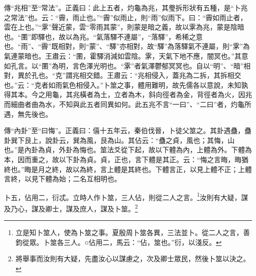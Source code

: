 {\noindent\zhuan{}\fzbyks 傳“兆相”至“常法”。正義曰：此上五者，灼龜為兆，其璺拆形狀有五種，是“卜兆之常法”也。云：“霽，雨止也。”“霽”似雨止，則“雨”似雨下。曰：“霽如雨止者，雲在上也。”“雺”聲近蒙，雲“零雨其蒙”，則蒙是暗之義，故以雺為兆，蒙是陰暗也。“圛”即驛也，故以為兆。“氣落驛不連屬”，“落驛”，希稀之意也。“雨”、“霽”既相對，則“蒙”、“驛”亦相對，故“驛”為落驛氣不連屬，則“雺”為氣連蒙暗也。王肅云：“圛，霍驛消減如雲陰。雺，天氣下地不應，闇冥也。”其意如孔言。以“圛”為明，言色澤光明也。“雺”者氣澤鬱郁冥冥也。自以“明”、“暗”相對，異於孔也。“克”謂兆相交錯。王肅云：“兆相侵入，蓋兆為二拆，其拆相交也。”云：“克者如雨氣色相侵入。”卜筮之事，體用難明，故先儒各以意說，未知孰得其本。今之用龜，其兆橫者為土，立者為木，斜向徑者為金，背徑者為火，因兆而細曲者曲為水，不知與此五者同異如何。此五兆不言“一曰”、“二曰”者，灼龜所遇，無先後也。 \par}

{\noindent\zhuan{}\fzbyks 傳“內卦”至“曰悔”。正義曰：僖十五年云，秦伯伐晉，卜徒父筮之。其卦遇蠱，蠱卦巽下艮上，說卦云，巽為風，艮為山。其佔云：“蠱之貞，風也；其悔，山也。”是內卦為貞，外卦為悔也。筮法爻從下起，故以下體為內，上體為外。下體為本，因而重之，故以下卦為貞。貞，正也，言下體是其正。云：“悔之言晦，晦猶終也。”晦是月之終，故以為終，言上體是其終也。下體言正，以見上體不正；上體言終，以見下體為始；二名互相明也。 \par}

卜五，佔用二，衍忒。立時人作卜筮，三人佔，則從二人之言。\footnote{立是知卜筮人，使為卜筮之事。夏殷周卜筮各異，三法並卜。從二人之言，善鈞從眾。卜筮各三人。○佔用二，馬云：“佔，筮也。”衍，以淺反。}汝則有大疑，謀及乃心，謀及卿士，謀及庶人，謀及卜筮。\footnote{將舉事而汝則有大疑，先盡汝心以謀慮之，次及卿士眾民，然後卜筮以決之。}


